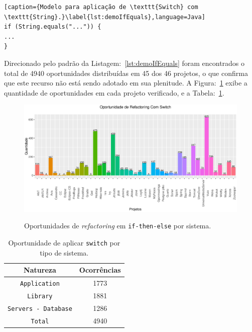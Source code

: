 \begin{lstlisting}[caption={Modelo para aplicação de \texttt{Switch} com \texttt{String}.}\label{lst:demoIfEquals},language=Java] 
if (String.equals("...")) {
...
}
\end{lstlisting}

Direcionado pelo padrão da Listagem:~\ref{lst:demoIfEquals} foram encontrados o total de \num{4940} oportunidades distribuídas em \num{45} dos \num{46} projetos, o que confirma que este recurso não está sendo adotado em sua plenitude. A Figura:~\ref{fig:oportunidadesSwitchString} exibe a quantidade de oportunidades em cada projeto verificado, e a Tabela:~\ref{tab:oportunidadesSwitchPorNatureza}.

\begin{figure}[h]
	\center
	\includegraphics[scale=0.55]{Imagens/oportunidadesSwitchString}
	\label{fig:oportunidadesSwitchString}
	\caption{Oportunidades de \textit{refactoring} em \texttt{if-then-else} por sistema.}
\end{figure}


\begin{table}[h]
	\centering
	\caption{Oportunidade de aplicar \texttt{switch} por tipo de sistema.}
	\begin{tabular}{cc}
		\hline
		Natureza & Ocorrências \\ 
		\hline \hline
		\texttt{Application} & 1773 \\ 
		\texttt{Library} & 1881 \\ 
		\texttt{Servers - Database} & 1286 \\ \hline
		\texttt{Total} & 4940 \\ \hline
	\end{tabular}
	\label{tab:oportunidadesSwitchPorNatureza} %
\end{table}



